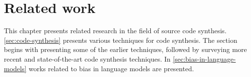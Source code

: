 \chapter{Related work}
\label{chap:related-work}

This chapter presents related research in the field of source code synthesis. \cref{sec:code-synthesis} presents various techniques for code synthesis. The section begins with presenting some of the earlier techniques, followed by surveying more recent and state-of-the-art code synthesis techniques. In \cref{sec:bias-in-language-models} works related to bias in language models are presented.

%
%
%
%
%
%
%
%
%
%
%
%
%
%
%
